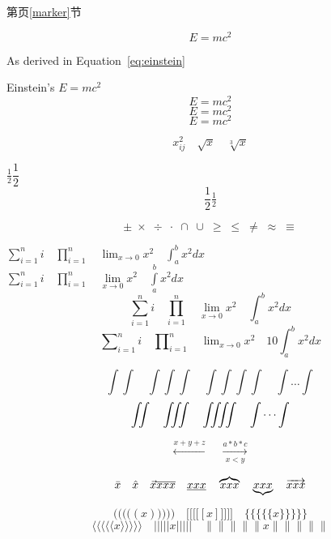 \documentclass{article}
\begin{document}

第\pageref{marker}页\ref{marker}节

\begin{equation}
    E=mc^2 \label{eq:einstein}
\end{equation}

As derived in Equation~\ref{eq:einstein}

Einstein's $E=mc^2$
\[ E=mc^2 \]
\[ \boxed{E=mc^2} \]
\begin{equation}
E=mc^2
\end{equation}

\[
x_{ij}^2\quad \sqrt{x}\quad \sqrt[3]{x} 
\]

$ \frac{1}{2} \dfrac{1}{2} $
\[ \frac{1}{2}
\tfrac{1}{2} \]


\[ \pm\; \times\; \div\; \cdot\; \cap\; \cup\;
\geq\; \leq\; \neq\; \approx\; \equiv \]


\newpage
$ \sum_{i=1}^n i\quad \prod_{i=1}^n\quad
\lim_{x\to0}x^2\quad \int_a^b x^2 dx $\\
$ \sum\limits_{i=1}^n i\quad \prod\limits_{i=1}^n\quad
\lim\limits_{x\to0}x^2\quad \int\limits_a^b x^2 dx $
\[ \sum_{i=1}^n i\quad \prod_{i=1}^n\quad
\lim_{x\to0}x^2\quad \int_a^b x^2 dx \]
\[ \sum\nolimits_{i=1}^n i\quad
\prod\nolimits_{i=1}^n\quad
\lim\nolimits_{x\to0}x^2\quad
10 \int\nolimits_a^b x^2 dx \]


\[ \int\int\quad \int\int\int\quad
\int\int\int\int\quad \int\dots\int \]
\[ \iint\quad \iiint\quad \iiiint\quad \idotsint \]

\[ \xleftarrow{x+y+z}\quad
\xrightarrow[x<y]{a*b*c} \]

\[
\bar{x} \quad \hat{x} \quad \vec{x} \\
\overline{xxx} \quad \underline{xxx} \quad \overbrace{xxx} 
\quad \underbrace{xxx} \quad \overrightarrow{xxx}
\]

\[ \Bigg(\bigg(\Big(\big((x)\big)\Big)\bigg)\Bigg)\quad
\Bigg[\bigg[\Big[\big[[x]\big]\Big]\bigg]\Bigg]\quad
\Bigg\{\bigg\{\Big\{\big\{\{x\}\big\}\Big\}\bigg\}\Bigg\}
\]\[
\Bigg\langle\bigg\langle\Big\langle\big\langle\langle x
\rangle\big\rangle\Big\rangle\bigg\rangle\Bigg\rangle\quad
\Bigg\lvert\bigg\lvert\Big\lvert\big\lvert\lvert x
\rvert\big\rvert\Big\rvert\bigg\rvert\Bigg\rvert\quad
\Bigg\lVert\bigg\lVert\Big\lVert\big\lVert\lVert x
\rVert\big\rVert\Big\rVert\bigg\rVert\Bigg\rVert \]
\end{document}
